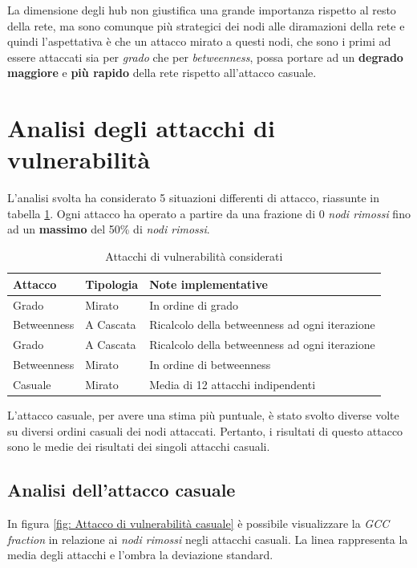La dimensione degli hub non giustifica una grande importanza rispetto al resto della rete, ma sono comunque più strategici dei nodi alle diramazioni della rete e quindi l'aspettativa è che un attacco mirato a questi nodi, che sono i primi ad essere attaccati sia per \textit{grado} che per \textit{betweenness}, possa portare ad un \textbf{degrado} \textbf{maggiore} e \textbf{più rapido} della rete rispetto all'attacco casuale. 

\section{Analisi degli attacchi di vulnerabilità}
L'analisi svolta ha considerato 5 situazioni differenti di attacco, riassunte in tabella \ref{tab: Attacchi di vulnerabilità considerati}. Ogni attacco ha operato a partire da una frazione di 0 \textit{nodi rimossi} fino ad un \textbf{massimo} del 50\% di \textit{nodi rimossi}.

\vspace{1em}
\begin{table}[!ht]
\centering
\begin{tabular}{l l l}
\hline
\textbf{Attacco} & \textbf{Tipologia} & \textbf{Note implementative} \\
\hline
Grado & Mirato & In ordine di grado \\
Betweenness & A Cascata & Ricalcolo della betweenness ad ogni iterazione \\
Grado & A Cascata & Ricalcolo della betweenness ad ogni iterazione \\
Betweenness & Mirato & In ordine di betweenness \\
Casuale & Mirato & Media di 12 attacchi indipendenti \\
\hline
\end{tabular}
\caption{Attacchi di vulnerabilità considerati}
\label{tab: Attacchi di vulnerabilità considerati}
\end{table}
\vspace{1em}

L'attacco casuale, per avere una stima più puntuale, è stato svolto diverse volte su diversi ordini casuali dei nodi attaccati. Pertanto, i risultati di questo attacco sono le medie dei risultati dei singoli attacchi casuali.

\subsection{Analisi dell'attacco casuale}
In figura \ref{fig: Attacco di vulnerabilità casuale} è possibile visualizzare la \textit{GCC fraction} in relazione ai \textit{nodi rimossi} negli attacchi casuali. La linea rappresenta la media degli attacchi e l'ombra la deviazione standard.

